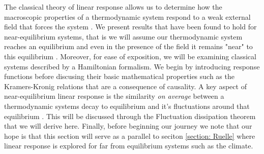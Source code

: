
The classical theory of linear response allows us to determine how the macroscopic properties of a thermodynamic system respond to a weak external field that forces the system \cite{Dorfman1999}. We present results that have been found to hold for near-equilibrium systems, that is we will assume our thermodynamic system reaches an equilibrium and even in the presence of the field it remains "near" to this equilibrium \cite{LiviPoliti2017} \cite{Tong}. Moreover, for ease of exposition, we will be examining classical systems described by a Hamiltonian formalism. We begin by introducing response functions before discusing their basic mathematical properties such as the Kramers-Kronig relations that are a consequence of causality. A key aspect of near-equilibrium linear response is the similarity \textit{on average} between a thermodynamic systems decay to equilibrium and it's fluctuations around that equilibrium \cite{Reichl1999}. This will be discussed through the Fluctuation dissipation theorem that we will derive here. Finally, before beginning our journey we note that our hope is that this section will serve as a parallel to seciton \ref{section: Ruelle} where linear response is explored for far from equilibrium systems such as the climate. 